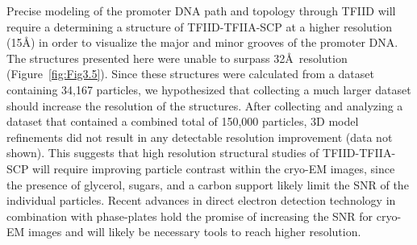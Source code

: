 \indent Precise modeling of the promoter DNA path and topology through TFIID will require a determining a structure of TFIID-TFIIA-SCP at a higher resolution (15\AA) in order to visualize the major and minor grooves of the promoter DNA. The structures presented here were unable to surpass 32\AA\ resolution (Figure~\ref{fig:Fig3.5}). Since these structures were calculated from a dataset containing 34,167 particles, we hypothesized that collecting a much larger dataset should increase the resolution of the structures. After collecting and analyzing a dataset that contained a combined total of 150,000 particles, 3D model refinements did not result in any detectable resolution improvement (data not shown). This suggests that high resolution structural studies of TFIID-TFIIA-SCP will require improving particle contrast within the cryo-EM images, since the presence of glycerol, sugars, and a carbon support likely limit the SNR of the individual particles. Recent advances in direct electron detection technology \cite{Campell_2012,Milazzo_2011} in combination with phase-plates \cite{Nagayama_2011} hold the promise of increasing the SNR for cryo-EM images and will likely be necessary tools to reach higher resolution.\\


